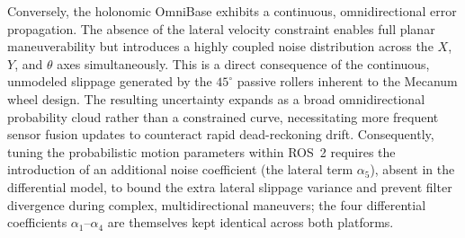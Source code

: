 Conversely, the holonomic OmniBase exhibits a continuous, omnidirectional error propagation. The absence of the lateral velocity constraint enables full planar maneuverability but introduces a highly coupled noise distribution across the $X$, $Y$, and $\theta$ axes simultaneously. This is a direct consequence of the continuous, unmodeled slippage generated by the $45^{\circ}$ passive rollers inherent to the Mecanum wheel design. The resulting uncertainty expands as a broad omnidirectional probability cloud rather than a constrained curve, necessitating more frequent sensor fusion updates to counteract rapid dead-reckoning drift. Consequently, tuning the probabilistic motion parameters within ROS~2 requires the introduction of an additional noise coefficient (the lateral term $\alpha_5$), absent in the differential model, to bound the extra lateral slippage variance and prevent filter divergence during complex, multidirectional maneuvers; the four differential coefficients $\alpha_1$--$\alpha_4$ are themselves kept identical across both platforms.

